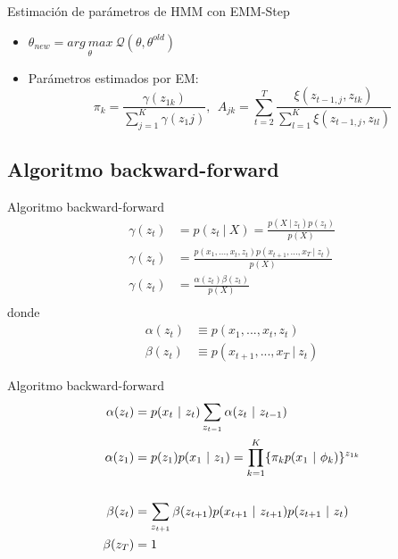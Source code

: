 \begin{frame}{Estimación de parámetros de HMM con EM}{M-Step}          
  \begin{itemize}
     \itemsep1.5em
     \item $\theta_{new} = \underset{\theta}{arg~max}~\mathcal{Q}(\theta, \theta^{old})$
     \item Parámetros estimados por EM: 
     \begin{equation}
       \pi_k = \frac{\gamma(z_{1k})}{\sum_{j=1}^K \gamma(z_1j)}, ~~
       A_{jk} = \sum_{t=2}^T \frac{\xi(z_{t-1,j}, z_{tk})}{ \sum_{l=1}^K \xi(z_{t-1,j}, z_{tl})}
     \end{equation}
  \end{itemize}
\end{frame}

\subsection{Algoritmo backward-forward}
\label{sec:algoritmo_backward_forward}

\begin{frame}{Algoritmo backward-forward}
  \begin{align}
  \gamma(z_t) &= p(z_t ~|~ X) = \frac{p(X ~|~ z_t) p(z_t)}{p(X)} \\
  \gamma(z_t) &= \frac{p(x_1, ..., x_t, z_t)p(x_{t+1}, ..., x_T ~|~ z_t)}{p(X)} \\
  \gamma(z_t) &= \frac{\alpha(z_t) \beta(z_t)}{p(X)} \\  
  \end{align}
  donde 
  \begin{align}
    \alpha(z_t) &\equiv p(x_1, ..., x_t, z_t) \\
    \beta(z_t) &\equiv p(x_{t+1}, ..., x_T ~|~ z_t)    
  \end{align}  
\end{frame}

\begin{frame}{Algoritmo backward-forward}
  \begin{align}
    \alpha(z_t) &= p(x_t ~|~ z_t) \sum_{z_{t-1}} \alpha(z_t ~|~ z_{t-1}) 
    \label{eqn:3-15}
    \\ 
    \alpha(z_1) &= p(z_1) p(x_1 ~|~ z_1) = \prod_{k=1}^K \lbrace {\pi_k p(x_1 ~|~ \phi_k)} \rbrace ^ {z_{1k}} 
    \\ 
    \notag \\ 
    \beta(z_t) &= \sum_{z_{t+1}} \beta(z_{t+1})p(x_{t+1} ~|~ z_{t+1}) p(z_{t+1} ~|~ z_t) \\ 
    \beta(z_T) &= 1
  \end{align}  
\end{frame}

